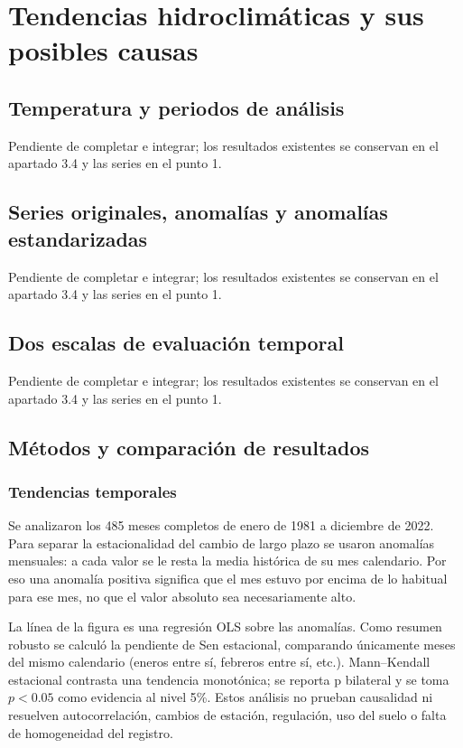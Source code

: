 \documentclass[10pt,a4paper]{article}
\begin{document}
\section{Tendencias hidroclimáticas y sus posibles causas}
\subsection{Temperatura y periodos de análisis}
Pendiente de completar e integrar; los resultados existentes se conservan en el apartado 3.4 y las series en el punto 1.
\subsection{Series originales, anomalías y anomalías estandarizadas}
Pendiente de completar e integrar; los resultados existentes se conservan en el apartado 3.4 y las series en el punto 1.
\subsection{Dos escalas de evaluación temporal}
Pendiente de completar e integrar; los resultados existentes se conservan en el apartado 3.4 y las series en el punto 1.
\subsection{Métodos y comparación de resultados}
\subsubsection*{Tendencias temporales}
Se analizaron los 485 meses completos de enero de 1981 a diciembre de 2022.
Para separar la estacionalidad del cambio de largo plazo se usaron anomalías
mensuales: a cada valor se le resta la media histórica de su mes calendario.
Por eso una anomalía positiva significa que el mes estuvo por encima de lo
habitual para ese mes, no que el valor absoluto sea necesariamente alto.

La línea de la figura es una regresión OLS sobre las anomalías. Como resumen
robusto se calculó la pendiente de Sen estacional, comparando únicamente meses
del mismo calendario (eneros entre sí, febreros entre sí, etc.). Mann--Kendall
estacional contrasta una tendencia monotónica; se reporta p bilateral y se toma
$p<0.05$ como evidencia al nivel 5\%. Estos análisis no prueban causalidad ni
resuelven autocorrelación, cambios de estación, regulación, uso del suelo o
falta de homogeneidad del registro.
\end{document}
